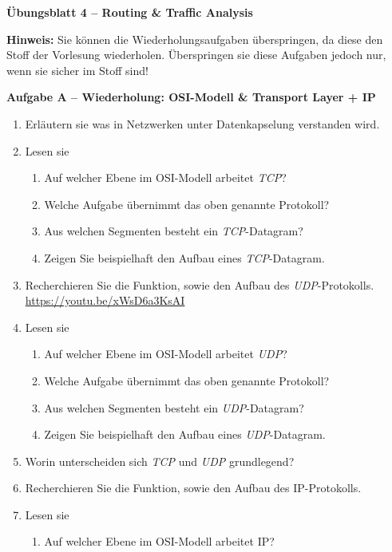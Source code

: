 \documentclass[paper=a4,fontsize=11pt]{scrartcl}%
\numberwithin{equation}{section}
\begin{document}
\begin{center}
\Large{\textbf{Übungsblatt 4 -- Routing \& Traffic Analysis}}
\end{center}
\textbf{Hinweis:} Sie können die Wiederholungsaufgaben überspringen, da diese den Stoff der Vorlesung wiederholen. Überspringen sie diese Aufgaben jedoch nur, wenn sie sicher im Stoff sind!
\begin{center}\Large{\textbf{Aufgabe A -- Wiederholung: OSI-Modell \& Transport Layer + IP}}\end{center}
\begin{enumerate}
	\item Erläutern sie was in Netzwerken unter Datenkapselung verstanden wird.
	\item Lesen sie \cite[Kap. 3.1, 3.4]{Kurose2012}
	\begin{enumerate}
		\item Auf welcher Ebene im OSI-Modell arbeitet \emph{TCP}?
		\item Welche Aufgabe übernimmt das oben genannte Protokoll?
		\item Aus welchen Segmenten besteht ein \emph{TCP}-Datagram?
		\item Zeigen Sie beispielhaft den Aufbau eines \emph{TCP}-Datagram.
	\end{enumerate}
	\item Recherchieren Sie die Funktion, sowie den Aufbau des \emph{UDP}-Protokolls.\\
	\url{https://youtu.be/xWsD6a3KsAI}
	\item Lesen sie \cite[Kap. 3.3]{Kurose2012}
	\begin{enumerate}
		\item Auf welcher Ebene im OSI-Modell arbeitet \emph{UDP}?
		\item Welche Aufgabe übernimmt das oben genannte Protokoll?
		\item Aus welchen Segmenten besteht ein \emph{UDP}-Datagram?
		\item Zeigen Sie beispielhaft den Aufbau eines \emph{UDP}-Datagram.
	\end{enumerate}
	\item Worin unterscheiden sich \emph{TCP} und \emph{UDP} grundlegend?
	\item Recherchieren Sie die Funktion, sowie den Aufbau des IP-Protokolls.
	\item Lesen sie \cite[Kap. 4.1]{Kurose2012}
	\begin{enumerate}
		\item Auf welcher Ebene im OSI-Modell arbeitet IP?

\end{enumerate}
\end{enumerate}
\end{document}
